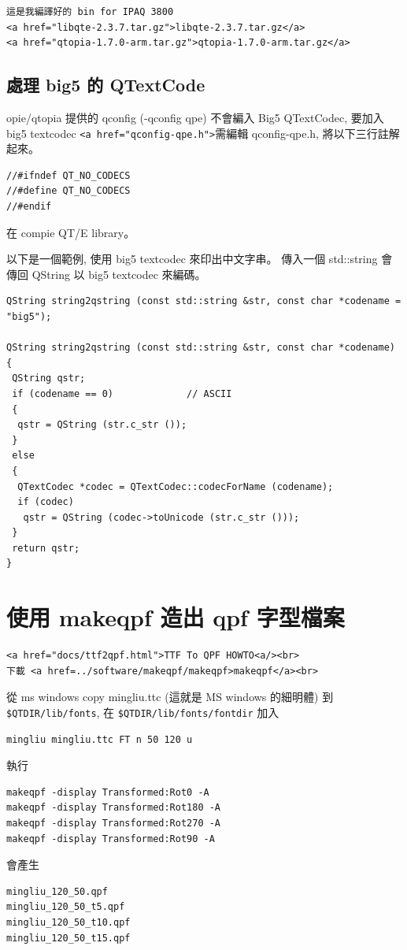 \documentclass[12pt,a4paper]{article}
\begin{document}
\begin{CJK}{UTF8}{cwmu}
\begin{verbatim}
這是我編譯好的 bin for IPAQ 3800
<a href="libqte-2.3.7.tar.gz">libqte-2.3.7.tar.gz</a>
<a href="qtopia-1.7.0-arm.tar.gz">qtopia-1.7.0-arm.tar.gz</a>
\end{verbatim}

\subsection{處理 big5 的 QTextCode}
opie/qtopia 提供的 qconfig (-qconfig qpe) 不會編入 Big5 QTextCodec,
要加入 big5 textcodec \verb+<a href="qconfig-qpe.h">+需編輯 qconfig-qpe.h,
將以下三行註解起來。
\begin{verbatim}
//#ifndef QT_NO_CODECS
//#define QT_NO_CODECS
//#endif
\end{verbatim}
在 compie QT/E library。

以下是一個範例, 使用 big5 textcodec 來印出中文字串。
傳入一個 std::string 會傳回 QString 以 big5 textcodec 來編碼。

\begin{verbatim}
QString string2qstring (const std::string &str, const char *codename = "big5");

QString string2qstring (const std::string &str, const char *codename)
{
 QString qstr;
 if (codename == 0)             // ASCII
 {
  qstr = QString (str.c_str ());
 }
 else
 {
  QTextCodec *codec = QTextCodec::codecForName (codename);
  if (codec)
   qstr = QString (codec->toUnicode (str.c_str ()));
 }
 return qstr;
}  
\end{verbatim}

\section{使用 makeqpf 造出 qpf 字型檔案}

\begin{verbatim}
<a href="docs/ttf2qpf.html">TTF To QPF HOWTO<a/><br>
下載 <a href=../software/makeqpf/makeqpf>makeqpf</a><br>
\end{verbatim}

從 ms windows copy mingliu.ttc (這就是 MS windows 的細明體) 到 \verb+$QTDIR/lib/fonts+, 在 
\verb+$QTDIR/lib/fonts/fontdir+ 加入

\begin{verbatim}
mingliu mingliu.ttc FT n 50 120 u
\end{verbatim}

執行
\begin{verbatim}
makeqpf -display Transformed:Rot0 -A
makeqpf -display Transformed:Rot180 -A
makeqpf -display Transformed:Rot270 -A
makeqpf -display Transformed:Rot90 -A
\end{verbatim}
會產生
\begin{verbatim}
mingliu_120_50.qpf      
mingliu_120_50_t5.qpf
mingliu_120_50_t10.qpf  
mingliu_120_50_t15.qpf
\end{verbatim}


\end{CJK}
\end{document}
